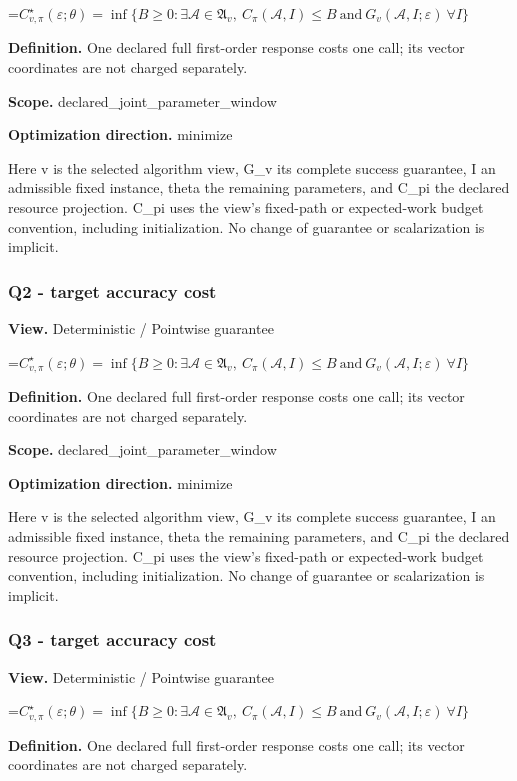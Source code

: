 \documentclass[10pt,a4paper]{article}
\newcommand{\AtlasMath}[1]{\par\begingroup\centering\setbox0=\hbox{$\displaystyle #1$}\ifdim\wd0>1.4\linewidth\typeout{ATLAS WIDE FORMULA: \the\wd0}\fi\ifdim\wd0>\linewidth\resizebox{\linewidth}{!}{\box0}\else\box0\fi\par\endgroup}
\begin{document}
\AtlasMath{C^\star_{v,\pi}(\varepsilon;\theta)=\inf\{B\ge0:\exists\mathcal A\in\mathfrak A_v,\ C_\pi(\mathcal A,I)\le B\ \text{and}\ G_v(\mathcal A,I;\varepsilon)\ \forall I\}}
\textbf{Definition.} One declared full first-order response costs one call; its vector coordinates are not charged separately.

\textbf{Scope.} declared\_joint\_parameter\_window

\textbf{Optimization direction.} minimize

Here v is the selected algorithm view, G\_v its complete success guarantee, I an admissible fixed instance, theta the remaining parameters, and C\_pi the declared resource projection. C\_pi uses the view's fixed-path or expected-work budget convention, including initialization. No change of guarantee or scalarization is implicit.

\subsubsection{Q2 - target accuracy cost}
\textbf{View.} Deterministic / Pointwise guarantee

\AtlasMath{C^\star_{v,\pi}(\varepsilon;\theta)=\inf\{B\ge0:\exists\mathcal A\in\mathfrak A_v,\ C_\pi(\mathcal A,I)\le B\ \text{and}\ G_v(\mathcal A,I;\varepsilon)\ \forall I\}}
\textbf{Definition.} One declared full first-order response costs one call; its vector coordinates are not charged separately.

\textbf{Scope.} declared\_joint\_parameter\_window

\textbf{Optimization direction.} minimize

Here v is the selected algorithm view, G\_v its complete success guarantee, I an admissible fixed instance, theta the remaining parameters, and C\_pi the declared resource projection. C\_pi uses the view's fixed-path or expected-work budget convention, including initialization. No change of guarantee or scalarization is implicit.

\subsubsection{Q3 - target accuracy cost}
\textbf{View.} Deterministic / Pointwise guarantee

\AtlasMath{C^\star_{v,\pi}(\varepsilon;\theta)=\inf\{B\ge0:\exists\mathcal A\in\mathfrak A_v,\ C_\pi(\mathcal A,I)\le B\ \text{and}\ G_v(\mathcal A,I;\varepsilon)\ \forall I\}}
\textbf{Definition.} One declared full first-order response costs one call; its vector coordinates are not charged separately.
\end{document}
